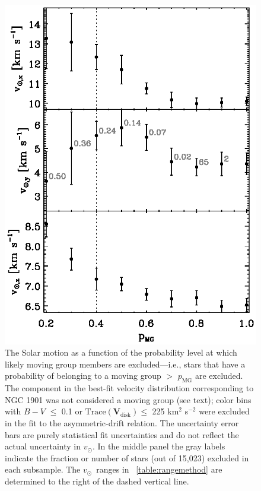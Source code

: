 \documentclass[12pt,preprint]{aastex}
\newcommand{\ie}{i.e.}
\newcommand{\ten}[1]{\mathbf{#1}} %
\newcommand{\VV}{\ten{V}}
\newcommand{\trace}{\mathrm{Trace}}
\newcommand{\pmg}{p_{\mathrm{MG}}}
\newcommand{\vsunlsr}{\ensuremath{v_\odot}}
\newcommand{\bminusv}{\ensuremath{B-V}}
\newcommand{\nstars}{15,023}
\newcommand{\VVdisk}{\VV_{\mathrm{\!disk}}}
\begin{document}
\clearpage
\begin{figure}
\includegraphics[]{SMvsPMG.ps}
\caption{The Solar motion as a function of the probability level at
which likely moving group members are excluded---\ie, stars that have
a probability of belonging to a moving group $>$ $\pmg$ are
excluded. The component in the best-fit velocity distribution
corresponding to NGC 1901 was not considered a moving group (see
text); color bins with $\bminusv$ $\leq$ 0.1 or $\trace(\VVdisk) \leq$ 225
km$^2$ s$^{-2}$ were excluded in the fit to the asymmetric-drift
relation. The uncertainty error bars are purely statistical fit
uncertainties and do not reflect the actual uncertainty in
\vsunlsr. In the middle panel the gray labels indicate the fraction or
number of stars (out of \nstars) excluded in each subsample. The
\vsunlsr\ ranges in \tablename~\ref{table:rangemethod} are determined
to the right of the dashed vertical line.}\label{fig:smvspmg}
\end{figure}
\end{document}

